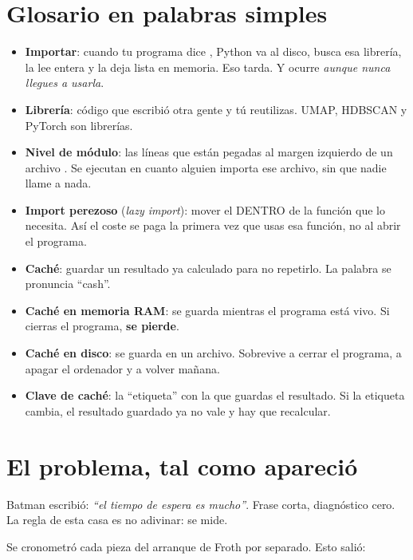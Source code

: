 \documentclass[11pt,a4paper]{article}
\begin{document}

\section{Glosario en palabras simples}

\begin{itemize}
  \item \textbf{Importar}: cuando tu programa dice , Python va al
        disco, busca esa librería, la lee entera y la deja lista en memoria. Eso tarda.
        Y ocurre \emph{aunque nunca llegues a usarla}.
  \item \textbf{Librería}: código que escribió otra gente y tú reutilizas. UMAP, HDBSCAN
        y PyTorch son librerías.
  \item \textbf{Nivel de módulo}: las líneas que están pegadas al margen izquierdo de un
        archivo . Se ejecutan en cuanto alguien importa ese archivo, sin que
        nadie llame a nada.
  \item \textbf{Import perezoso} (\emph{lazy import}): mover el  DENTRO de
        la función que lo necesita. Así el coste se paga la primera vez que usas esa
        función, no al abrir el programa.
  \item \textbf{Caché}: guardar un resultado ya calculado para no repetirlo. La palabra
        se pronuncia ``cash''.
  \item \textbf{Caché en memoria RAM}: se guarda mientras el programa está vivo. Si
        cierras el programa, \textbf{se pierde}.
  \item \textbf{Caché en disco}: se guarda en un archivo. Sobrevive a cerrar el programa,
        a apagar el ordenador y a volver mañana.
  \item \textbf{Clave de caché}: la ``etiqueta'' con la que guardas el resultado. Si la
        etiqueta cambia, el resultado guardado ya no vale y hay que recalcular.
\end{itemize}

\section{El problema, tal como apareció}

Batman escribió: \emph{``el tiempo de espera es mucho''}. Frase corta, diagnóstico cero.
La regla de esta casa es no adivinar: se mide.

Se cronometró cada pieza del arranque de Froth por separado. Esto salió:
\end{document}

